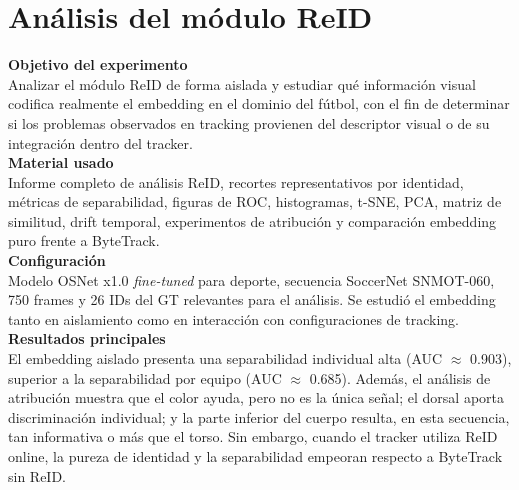 \documentclass[../MAIN.tex]{subfiles}
\begin{document}
	
	
	\section{Análisis del módulo ReID}
	
	
	\begin{chaptertemplatebox}
		\textbf{Objetivo del experimento}\\
		Analizar el módulo ReID de forma aislada y estudiar qué información visual codifica realmente el embedding en el dominio del fútbol, con el fin de determinar si los problemas observados en tracking provienen del descriptor visual o de su integración dentro del tracker.\\[0.5em]
		
		\textbf{Material usado}\\
		Informe completo de análisis ReID, recortes representativos por identidad, métricas de separabilidad, figuras de ROC, histogramas, t-SNE, PCA, matriz de similitud, drift temporal, experimentos de atribución y comparación embedding puro frente a ByteTrack.\\[0.5em]
		
		\textbf{Configuración}\\
		Modelo OSNet x1.0 \textit{fine-tuned} para deporte, secuencia SoccerNet SNMOT-060, 750 frames y 26 IDs del GT relevantes para el análisis. Se estudió el embedding tanto en aislamiento como en interacción con configuraciones de tracking.\\[0.5em]
		
		\textbf{Resultados principales}\\
		El embedding aislado presenta una separabilidad individual alta (AUC $\approx$ 0.903), superior a la separabilidad por equipo (AUC $\approx$ 0.685). Además, el análisis de atribución muestra que el color ayuda, pero no es la única señal; el dorsal aporta discriminación individual; y la parte inferior del cuerpo resulta, en esta secuencia, tan informativa o más que el torso. Sin embargo, cuando el tracker utiliza ReID online, la pureza de identidad y la separabilidad empeoran respecto a ByteTrack sin ReID.\\[0.5em]
		

\end{chaptertemplatebox}
\end{document}
